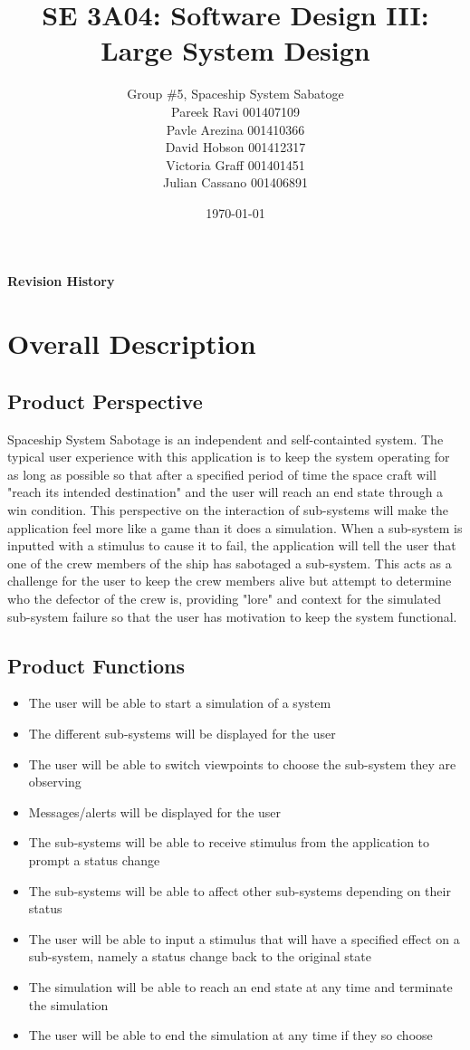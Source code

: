 \documentclass[12pt, titlepage]{article}
\title{SE 3A04: Software Design III: Large System Design}
\author{Group \#5, Spaceship System Sabatoge %
		\\Pareek Ravi 001407109
		\\Pavle Arezina 001410366
		\\David Hobson 001412317
		\\Victoria Graff 001401451
		\\Julian Cassano 001406891
}
\date{\today}
\begin{document}
\maketitle
{}
\tableofcontents
\listoftables
\listoffigures
\begin{table}[bp]
\caption{\bf Revision History}
\end{table}
\newpage
{}

\section{Overall Description}
\subsection{Product Perspective}
Spaceship System Sabotage is an independent and self-containted system. The typical user experience with this application is to keep the system operating for as long as possible so that after a specified period of time the space craft will "reach its intended destination" and the user will reach an end state through a win condition. This perspective on the interaction of sub-systems will make the application feel more like a game than it does a simulation. When a sub-system is inputted with a stimulus to cause it to fail, the application will tell the user that one of the crew members of the ship has sabotaged a sub-system. This acts as a challenge for the user to keep the crew members alive but attempt to determine who the defector of the crew is, providing "lore" and context for the simulated sub-system failure so that the user has motivation to keep the system functional.

\subsection{Product Functions}
\begin{itemize}
\item The user will be able to start a simulation of a system
\item The different sub-systems will be displayed for the user
\item The user will be able to switch viewpoints to choose the sub-system they are observing
\item Messages/alerts will be displayed for the user
\item The sub-systems will be able to receive stimulus from the application to prompt a status change
\item The sub-systems will be able to affect other sub-systems depending on their status
\item The user will be able to input a stimulus that will have a specified effect on a sub-system, namely a status change back to the original state
\item The simulation will be able to reach an end state at any time and terminate the simulation
\item The user will be able to end the simulation at any time if they so choose
\end{itemize}
\end{document}
